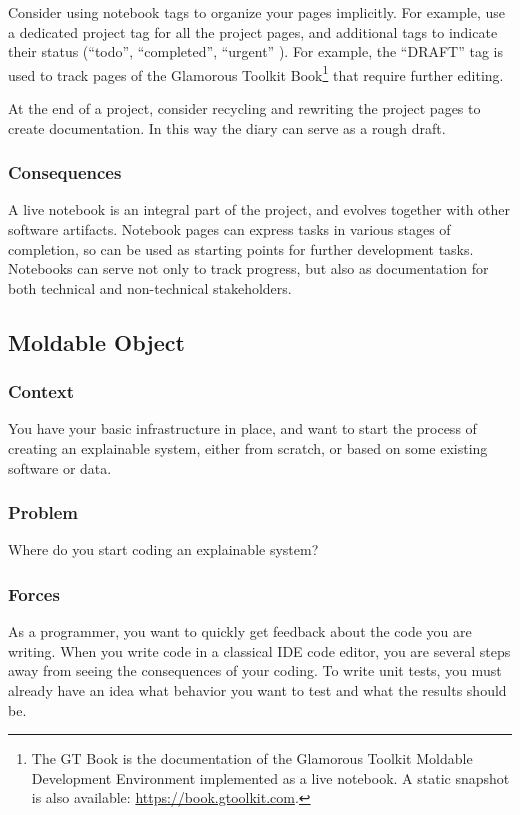 \documentclass[sigconf]{acmart}
\begin{document}
Consider using notebook tags to organize your pages implicitly. For example, use a dedicated project tag for all the project pages, and additional tags to indicate their status (``todo'', ``completed'', ``urgent'' \etc).
For example, the ``DRAFT'' tag is used to track pages of the Glamorous Toolkit Book\footnote{The GT Book is the documentation of the Glamorous Toolkit Moldable Development Environment implemented as a live notebook. A static snapshot is also available: \url{https://book.gtoolkit.com}.} that require further editing.

At the end of a project, consider recycling and rewriting the project pages to create documentation. In this way the diary can serve as a rough draft.

\subsubsection*{Consequences}

A live notebook is an integral part of the project, and evolves together with other software artifacts.
Notebook pages can express tasks in various stages of completion, so can be used as starting points for further development tasks.
Notebooks can serve not only to track progress, but also as documentation for both technical and non-technical stakeholders.

\subsection*{Moldable Object}\label{pat:moldableObject}
\subsubsection*{Context}
You have your basic infrastructure in place, and want to start the process of creating an explainable system, either from scratch, or based on some existing software or data.

\subsubsection*{Problem}
Where do you start coding an explainable system?

\subsubsection*{Forces}
As a programmer, you want to quickly get feedback about the code you are writing.
When you write code in a classical IDE code editor, you are several steps away from seeing the consequences of your coding.
To write unit tests, you must already have an idea what behavior you want to test and what the results should be.
\end{document}
